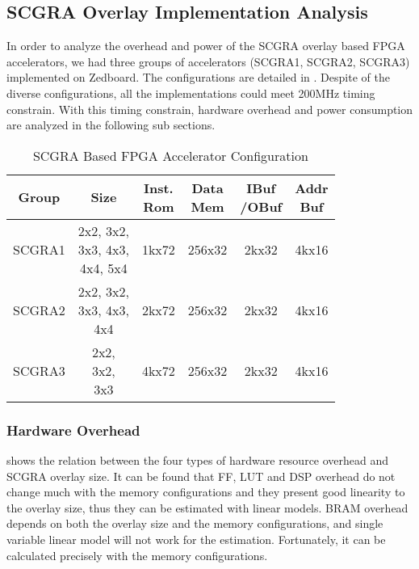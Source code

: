\subsection{SCGRA Overlay Implementation Analysis}
In order to analyze the overhead and power of the SCGRA overlay 
based FPGA accelerators, we had three groups of accelerators 
(SCGRA1, SCGRA2, SCGRA3) implemented on Zedboard. The configurations 
are detailed in . Despite of the diverse 
configurations, all the implementations could meet 200MHz 
timing constrain. With this timing constrain, 
hardware overhead and power consumption are analyzed in the 
following sub sections.
\begin{table}[tb]
    \small
    \centering
    \caption{SCGRA Based FPGA Accelerator Configuration \label{tab:config}}{
        \begin{tabular}{c|c|c|c|c|c}
            \hline
            Group & Size & \tabincell{c}{Inst. \\ Rom} & 
            \tabincell{c}{Data \\ Mem} & \tabincell{c}{IBuf \\ /OBuf} & 
            \tabincell{c}{Addr \\Buf} \\ \hline

            SCGRA1 & \tabincell{l}{2x2, 3x2, \\ 3x3, 4x3, \\ 4x4, 5x4} & 
            1kx72 & 256x32 & 2kx32 & 4kx16\\ \hline

            SCGRA2 & \tabincell{l}{2x2, 3x2, \\ 3x3, 4x3, \\4x4} & 
            2kx72 & 256x32 & 2kx32 & 4kx16\\ \hline

            SCGRA3 & \tabincell{l}{2x2, \\ 3x2, \\ 3x3 } &  
            4kx72 & 256x32 & 2kx32 & 4kx16\\ \hline
        \end{tabular}
    }
\end{table}

\subsubsection{Hardware Overhead}
 shows the relation between 
the four types of hardware resource overhead and SCGRA 
overlay size. It can be found that FF, LUT and DSP overhead 
do not change much with the memory configurations and they 
present good linearity to the overlay size, thus they can be 
estimated with linear models. BRAM overhead depends 
on both the overlay size and the memory configurations, 
and single variable linear model will not work for the estimation.
Fortunately, it can be calculated precisely with the memory 
configurations. 

